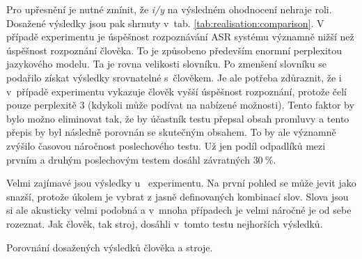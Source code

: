 Pro upřesnění je nutné zmínit, že \textit{i/y} na výsledném ohodnocení nehraje roli.
Dosažené výsledky jsou pak shrnuty v~tab. \ref{tab:realisation:comparison}.
V případě experimentu  je úspěšnost rozpoznávání ASR systému významně nižší než úspěšnost rozpoznání člověka.
To je způsobeno především enormní perplexitou jazykového modelu.
Ta je rovna velikosti slovníku.
Po zmenšení slovníku se podařilo získat výsledky srovnatelné s~člověkem.
Je ale potřeba zdůraznit, že i v~případě  experimentu vykazuje člověk vyšší úspěšnost rozpoznání, protože čelí pouze perplexitě $3$ (kdykoli může podívat na nabízené možnosti).
Tento faktor by bylo možno eliminovat tak, že by účastník testu přepsal obsah promluvy a tento přepis by byl následně porovnán se skutečným obsahem.
To by ale významně zvýšilo časovou náročnost poslechového testu.
Už jen podíl odpadlíků mezi prvním a druhým poslechovým testem dosáhl závratných $30~\%$.

Velmi zajímavé jsou výsledky u~ experimentu.
Na první pohled se může jevit jako snazší, protože úkolem je vybrat z jasně definovaných kombinací slov.
Slova jsou si ale akusticky velmi podobná a v~mnoha případech je velmi náročné je od sebe rozeznat.
Jak člověk, tak stroj, dosáhli v~tomto testu nejhorších výsledků.

\begin{table}[htpb]
  \centering
  \def\arraystretch{1.5}
  \caption{Porovnání dosažených výsledků člověka a stroje.}
  \label{tab:realisation:comparison}
\end{table}

